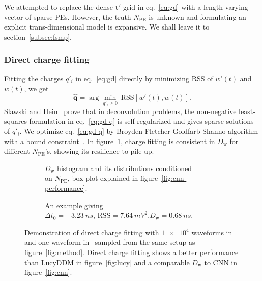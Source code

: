 We attempted to replace the dense $\bm{t'}$ grid in eq.~\eqref{eq:gd} with a length-varying vector of sparse PEs. However, the truth $N_\mathrm{PE}$ is unknown and formulating an explicit trans-dimensional model is expansive.  We shall leave it to section~\ref{subsec:fsmp}.

\subsubsection{Direct charge fitting}
\label{sec:dcf}

Fitting the charges $q'_i$ in eq.~\eqref{eq:gd} directly by minimizing RSS of $w'(t)$ and $w(t)$, we get
\begin{equation}
  \label{eq:gd-q}
  \bm{\hat{q}} = \arg \underset{q'_i \ge 0}{\min}~\mathrm{RSS}\left[w'(t),w(t)\right].
\end{equation}
Slawski and Hein~\cite{slawski_non-negative_2013} prove that in deconvolution problems, the non-negative least-squares formulation in eq.~\eqref{eq:gd-q} is self-regularized and gives sparse solutions of $q'_i$.  We optimize eq.~\eqref{eq:gd-q} by Broyden-Fletcher-\allowbreak{}Goldfarb-Shanno algorithm with a bound constraint~\cite{byrd_limited_1995}.  In figure~\ref{fig:fitting-npe}, charge fitting is consistent in $D_\mathrm{w}$ for different $N_\mathrm{PE}$'s, showing its resilience to pile-up.

\begin{figure}[H]
  \begin{subfigure}{.5\textwidth}
    \centering
    \resizebox{\textwidth}{!}{}
    \caption{\label{fig:fitting-npe} $D_\mathrm{w}$ histogram and its distributions conditioned \\ on $N_{\mathrm{PE}}$, box-plot explained in figure~\ref{fig:cnn-performance}.}
  \end{subfigure}
  \begin{subfigure}{.5\textwidth}
    \centering
    \resizebox{\textwidth}{!}{}
    \caption{\label{fig:fitting}An example giving \\ $\Delta{t_0}=\SI{-3.23}{ns}$, $\mathrm{RSS}=\SI{7.64}{mV^2}$,$D_\mathrm{w}=\SI{0.68}{ns}$.}
  \end{subfigure}
  \caption{\label{fig:dcf}Demonstration of direct charge fitting with $\num[retain-unity-mantissa=false]{1e4}$ waveforms in~ and one waveform in~ sampled from the same setup as figure~\ref{fig:method}.  Direct charge fitting shows a better performance than LucyDDM in figure~\ref{fig:lucy} and a comparable $D_\mathrm{w}$ to CNN in figure~\ref{fig:cnn}.}
\end{figure}

